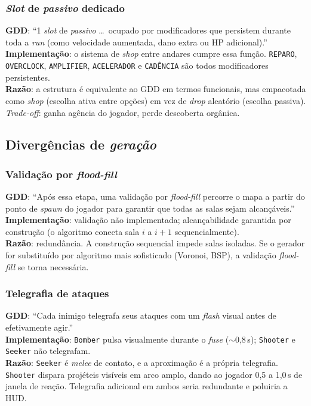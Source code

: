 \subsubsection*{\emph{Slot} de \emph{passivo} dedicado}

\textbf{GDD}: ``1 \emph{slot} de \emph{passivo} \dots\ ocupado por modificadores
que persistem durante toda a \emph{run} (como velocidade aumentada, dano extra
ou HP adicional).''\\
\textbf{Implementação}: o sistema de \emph{shop} entre andares cumpre essa
função. \texttt{REPARO}, \texttt{OVERCLOCK}, \texttt{AMPLIFIER},
\texttt{ACELERADOR} e \texttt{CADÊNCIA} são todos modificadores persistentes.\\
\textbf{Razão}: a estrutura é equivalente ao GDD em termos funcionais, mas
empacotada como \emph{shop} (escolha ativa entre opções) em vez de \emph{drop}
aleatório (escolha passiva). \emph{Trade-off}: ganha agência do jogador, perde
descoberta orgânica.

\subsection{Divergências de \emph{geração}}

\subsubsection*{Validação por \emph{flood-fill}}

\textbf{GDD}: ``Após essa etapa, uma validação por \emph{flood-fill} percorre o
mapa a partir do ponto de \emph{spawn} do jogador para garantir que todas as
salas sejam alcançáveis.''\\
\textbf{Implementação}: validação não implementada; alcançabilidade garantida
por construção (o algoritmo conecta sala $i$ a $i+1$ sequencialmente).\\
\textbf{Razão}: redundância. A construção sequencial impede salas isoladas. Se
o gerador for substituído por algoritmo mais sofisticado (Voronoi, BSP), a
validação \emph{flood-fill} se torna necessária.

\subsubsection*{Telegrafia de ataques}

\textbf{GDD}: ``Cada inimigo telegrafa seus ataques com um \emph{flash} visual
antes de efetivamente agir.''\\
\textbf{Implementação}: \texttt{Bomber} pulsa visualmente durante o \emph{fuse}
($\sim$0,8\,s); \texttt{Shooter} e \texttt{Seeker} não telegrafam.\\
\textbf{Razão}: \texttt{Seeker} é \emph{melee} de contato, e a aproximação é a
própria telegrafia. \texttt{Shooter} dispara projéteis visíveis em arco amplo,
dando ao jogador 0,5 a 1,0\,s de janela de reação. Telegrafia adicional em
ambos seria redundante e poluiria a HUD.

